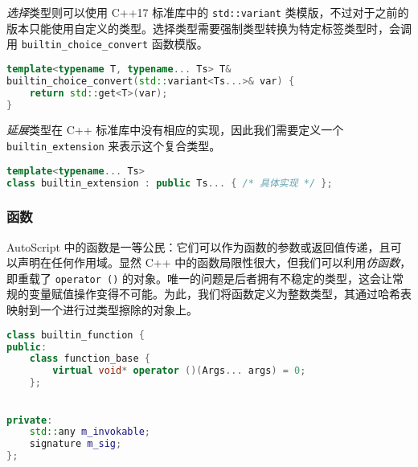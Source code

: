 \emph{选择}类型则可以使用 C++17 标准库中的 \lstinline!std::variant! 类模版，不过对于之前的版本只能使用自定义的类型。选择类型需要强制类型转换为特定标签类型时，会调用 \lstinline!builtin_choice_convert! 函数模版。

\begin{lstlisting}[language=C++]
template<typename T, typename... Ts> T&
builtin_choice_convert(std::variant<Ts...>& var) {
	return std::get<T>(var);
}
\end{lstlisting}

\emph{延展}类型在 C++ 标准库中没有相应的实现，因此我们需要定义一个 \lstinline!builtin_extension! 来表示这个复合类型。

\begin{lstlisting}[language=C++]
template<typename... Ts>
class builtin_extension : public Ts... { /* 具体实现 */ };
\end{lstlisting}


\subsubsection{函数}

AutoScript 中的函数是一等公民：它们可以作为函数的参数或返回值传递，且可以声明在任何作用域。显然 C++ 中的函数局限性很大，但我们可以利用\emph{仿函数}，即重载了 \lstinline!operator ()! 的对象。唯一的问题是后者拥有不稳定的类型，这会让常规的变量赋值操作变得不可能。为此，我们将函数定义为整数类型，其通过哈希表映射到一个进行过类型擦除的对象上。

\begin{lstlisting}[language=C++]
class builtin_function {
public:
	class function_base {
		virtual void* operator ()(Args... args) = 0;
	};
	

private:
	std::any m_invokable;
	signature m_sig;
};
\end{lstlisting}

